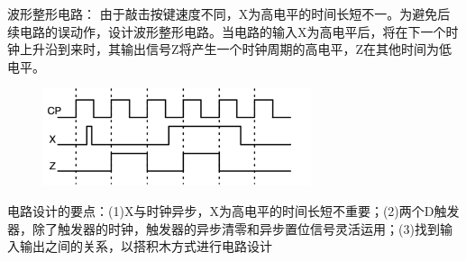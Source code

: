 \documentclass[a4paper,11pt,UTF8]{article}
\begin{document}
波形整形电路： 由于敲击按键速度不同，X为高电平的时间长短不一。为避免后续电路的误动作，设计波形整形电路。当电路的输入X为高电平后，将在下一个时钟上升沿到来时，其输出信号Z将产生一个时钟周期的高电平，Z在其他时间为低电平。
\begin{figure}[H]
	\centering
	\includegraphics[width=0.7\textwidth]{5_class}
\end{figure}
电路设计的要点：(1)X与时钟异步，X为高电平的时间长短不重要；(2)两个D触发器，除了触发器的时钟，触发器的异步清零和异步置位信号灵活运用；(3)找到输入输出之间的关系，以搭积木方式进行电路设计
\end{document}

